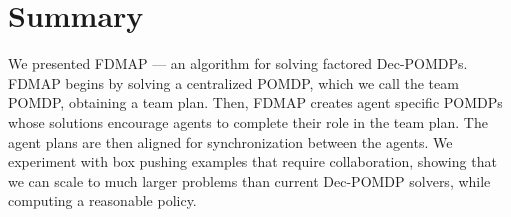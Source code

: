 \documentclass[letterpaper]{article} %
\theoremstyle{definition}
\newcommand{\commentout}[1]{}
\newcommand{\eliran}[1]{\textbf{[\color{red}ELIRAN:#1]}}
\newcommand{\guy}[1]{\textbf{[\color{orange}GUY:#1]}}
\begin{document}
\commentout{
\section{Related Work}

\guy{This still requires work}
QDec-POMDPs~\cite{QDECPOMDP} are qualitative version of Dec-POMDPS that tackle a conceptually simpler, more structured, model. In QDec-POMDPs 
non-determinism replaces stochastic uncertainty. The model is factored (i.e., described at the level of state variables rather than states), and actions 
are described using preconditions and non-determinstic effects. Although QDec-POMDPs are also NEXT-Time hard, recent work in the area that leverages heuristic-search planners, has been able to scale up to much larger domains (e.g., box pushing on a grid of size 24,  12 agents and 12 boxes, implying a state space of $24^{24}$)
albeit, under the assumptions that actions are deterministic.

Dec-POMDP algorithms.
}

\section{Summary}
We presented FDMAP --- an algorithm for solving factored Dec-POMDPs. FDMAP begins by solving a centralized POMDP, which we call the team POMDP, obtaining a team plan. Then, FDMAP creates agent specific POMDPs whose solutions encourage agents to complete their role in the team plan. The agent plans are then aligned for synchronization between the agents. We experiment with box pushing examples that require collaboration, showing that we can scale to much larger problems than current Dec-POMDP solvers, while computing a reasonable policy.
\end{document}
